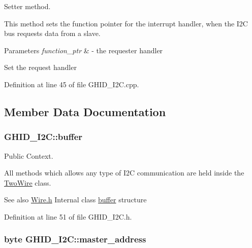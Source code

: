 \-Setter method. 

\-This method sets the function pointer for the interrupt handler, when the \-I2\-C bus requests data from a slave.


\begin{DoxyParams}{\-Parameters}
{\em function\-\_\-ptr} & -\/ the requester handler \\
\hline
\end{DoxyParams}
\-Set the request handler 

\-Definition at line 45 of file \-G\-H\-I\-D\-\_\-\-I2\-C.\-cpp.



\subsection{\-Member \-Data \-Documentation}
\hypertarget{class_g_h_i_d___i2_c_a6722de3f1d85e1488ae667f6fb04c2a0}{
\subsubsection[{buffer}]{ {\bf \-G\-H\-I\-D\-\_\-\-I2\-C\-::buffer}}}\label{class_g_h_i_d___i2_c_a6722de3f1d85e1488ae667f6fb04c2a0}


\-Public \-Context. 

\-All methods which allows any type of \-I2\-C communication are held inside the \hyperlink{class_two_wire}{\-Two\-Wire} class.

\begin{DoxySeeAlso}{\-See also}
\hyperlink{_wire_8h}{\-Wire.\-h} \-Internal class \hyperlink{class_g_h_i_d___i2_c_a6722de3f1d85e1488ae667f6fb04c2a0}{buffer} structure 
\end{DoxySeeAlso}


\-Definition at line 51 of file \-G\-H\-I\-D\-\_\-\-I2\-C.\-h.

\hypertarget{class_g_h_i_d___i2_c_ab168a66728f51bbbd877d604ebb18492}{
\subsubsection[{master\-\_\-address}]{\setlength{\rightskip}{0pt plus 5cm}byte {\bf \-G\-H\-I\-D\-\_\-\-I2\-C\-::master\-\_\-address}}}\label{class_g_h_i_d___i2_c_ab168a66728f51bbbd877d604ebb18492}



